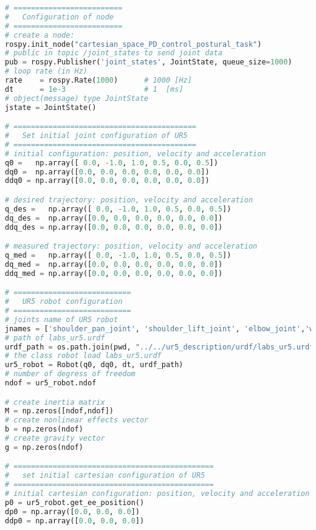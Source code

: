 \begin{lstlisting}[language=Python,caption={Move the ur5 robot end-effector using the Cartesian proportional-derivative control method and null space projection, \eqref{eq:cartesian_PD_N} to follows the Cartesian sinusoidal reference of activity \ref{subsec:generate_sinusoidal_reference}.}, label={lst:cartesian_PD_N}]
# =========================
#   Configuration of node
# =========================
# create a node: 
rospy.init_node("cartesian_space_PD_control_postural_task")
# public in topic /joint_states	to send joint data	
pub = rospy.Publisher('joint_states', JointState, queue_size=1000)
# loop rate (in Hz)
rate 	= rospy.Rate(1000)		# 1000 [Hz]
dt 		= 1e-3					# 1  [ms]
# object(message) type JointState
jstate = JointState()

# ==========================================
#   Set initial joint configuration of UR5
# ==========================================
# initial configuration: position, velocity and acceleration 
q0 =   np.array([ 0.0, -1.0, 1.0, 0.5, 0.0, 0.5])
dq0 =  np.array([0.0, 0.0, 0.0, 0.0, 0.0, 0.0]) 
ddq0 = np.array([0.0, 0.0, 0.0, 0.0, 0.0, 0.0]) 

# desired trajectory: position, velocity and acceleration
q_des =   np.array([ 0.0, -1.0, 1.0, 0.5, 0.0, 0.5])
dq_des =  np.array([0.0, 0.0, 0.0, 0.0, 0.0, 0.0]) 
ddq_des = np.array([0.0, 0.0, 0.0, 0.0, 0.0, 0.0]) 

# measured trajectory: position, velocity and acceleration
q_med =   np.array([ 0.0, -1.0, 1.0, 0.5, 0.0, 0.5])
dq_med =  np.array([0.0, 0.0, 0.0, 0.0, 0.0, 0.0]) 
ddq_med = np.array([0.0, 0.0, 0.0, 0.0, 0.0, 0.0]) 

# ===========================
#   UR5 robot configuration
# ===========================
# joints name of UR5 robot
jnames = ['shoulder_pan_joint', 'shoulder_lift_joint', 'elbow_joint','wrist_1_joint', 'wrist_2_joint', 'wrist_3_joint']
# path of labs_ur5.urdf
urdf_path = os.path.join(pwd, "../../ur5_description/urdf/labs_ur5.urdf")
# the class robot load labs_ur5.urdf
ur5_robot = Robot(q0, dq0, dt, urdf_path)
# number of degress of freedom
ndof = ur5_robot.ndof

# create inertia matrix 
M = np.zeros([ndof,ndof])
# create nonlinear effects vector
b = np.zeros(ndof)
# create gravity vector
g = np.zeros(ndof)

# ==============================================
#   set initial cartesian configuration of UR5
# ==============================================
# initial cartesian configuration: position, velocity and acceleration
p0 = ur5_robot.get_ee_position()
dp0 = np.array([0.0, 0.0, 0.0])
ddp0 = np.array([0.0, 0.0, 0.0])


\end{lstlisting}
